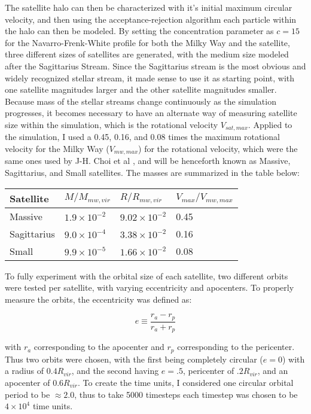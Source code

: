 \documentclass{article}
\begin{document}
The satellite halo can then be characterized with it's initial maximum circular velocity, and then using the acceptance-rejection algorithm each particle within the halo can then be modeled. By setting the concentration parameter as $c = 15$ for the Navarro-Frenk-White profile for both the Milky Way and the satellite, three different sizes of satellites are generated, with the medium size modeled after the Sagittarius Stream. Since the Sagittarius stream is the most obvious and widely recognized stellar stream, it made sense to use it as starting point, with one satellite magnitudes larger and the other satellite magnitudes smaller. Because mass of the stellar streams change continuously as the simulation progresses, it becomes necessary to have an alternate way of measuring satellite size within the simulation, which is the rotational velocity $V_{sat, max}$. Applied to the simulation, I used a 0.45, 0.16, and 0.08 times the maximum rotational velocity for the Milky Way ($V_{mw, max}$) for the rotational velocity, which were the same ones used by J-H. Choi et al \cite{dymanicsOfTidalTails}, and will be henceforth known as Massive, Sagittarius, and Small satellites. The masses are summarized in the table below:

\begin{center}
	\begin{tabular}{| l | l | l | l | }
		\hline Satellite & $M/M_{mw, vir}$ & $R/R_{mw, vir}$ & $V_{max}/V_{mw, max}$ \\ \hline
		Massive & $1.9 \times 10^{-2}$ & $9.02 \times 10^{-2}$ & 0.45 \\ \hline
		Sagittarius & $9.0 \times 10^{-4}$ & $3.38 \times 10^{-2}$ & 0.16 \\ \hline
		Small & $9.9 \times 10^{-5}$ & $1.66 \times 10^{-2}$ & 0.08 \\ \hline
	\end{tabular}
\end{center}

To fully experiment with the orbital size of each satellite, two different orbits were tested per satellite, with varying eccentricity and apocenters. To properly measure the orbits, the eccentricity was defined as:

\[
e \equiv \frac{r_a-r_p}{r_a+r_p}
\]

with $r_a$ corresponding to the apocenter and $r_p$ corresponding to the pericenter. Thus two orbits were chosen, with the first being completely circular ($e = 0$) with a radius of $0.4R_{vir}$, and the second having $e = .5$, pericenter of $.2R_{vir}$, and an apocenter of $0.6R_{vir}$. To create the time units, I considered one circular orbital period to be $\approx 2.0$, thus to take 5000 timesteps each timestep was chosen to be $4 \times 10^4$ time units.
\end{document}
